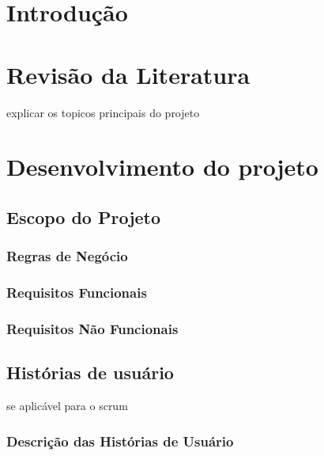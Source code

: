\documentclass[
12pt,				%
openany,			%
oneside,			%
a4paper,			%
english,			%
french,				%
spanish,			%
brazil				%
]{abntex2}
\begin{document}
	\chapter{Introdução}
	

	
	\chapter{Revisão da Literatura}
	explicar os topicos principais do projeto
	
	
		
	
	
	
	
	\chapter{Desenvolvimento do projeto}
	\section{Escopo do Projeto}
	\subsection{Regras de Negócio}
	\subsection{Requisitos Funcionais}
	\subsection{Requisitos Não Funcionais}
	\section{Histórias de usuário}
	se aplicável para o scrum
	\subsection{Descrição das Histórias de Usuário}
\end{document}
